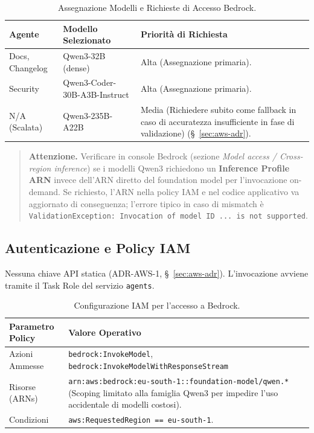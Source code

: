 \documentclass[11pt,a4paper]{article}
\begin{document}
\begin{table}[H]
\centering
\caption{Assegnazione Modelli e Richieste di Accesso Bedrock.}
\label{tab:aws-bedrock-modelli}
\vspace{2mm}
\renewcommand{\arraystretch}{1.2}
\begin{tabularx}{\textwidth}{|l|X|X|}
\hline
\textbf{Agente} & \textbf{Modello Selezionato} & \textbf{Priorità di Richiesta} \\ \hline
Docs, Changelog & Qwen3-32B (dense) & Alta (Assegnazione primaria). \\ \hline
Security & Qwen3-Coder-30B-A3B-Instruct & Alta (Assegnazione primaria). \\ \hline
N/A (Scalata) & Qwen3-235B-A22B & Media (Richiedere subito come fallback in caso di accuratezza insufficiente in fase di validazione) (\S~\ref{sec:aws-adr}). \\ \hline
\end{tabularx}
\end{table}

\begin{quote}
\textbf{Attenzione.} Verificare in console Bedrock (sezione \emph{Model access / Cross-region inference}) se i modelli Qwen3 richiedono un \textbf{Inference Profile ARN} invece dell'ARN diretto del foundation model per l'invocazione on-demand. Se richiesto, l'ARN nella policy IAM e nel codice applicativo va aggiornato di conseguenza; l'errore tipico in caso di mismatch è \texttt{ValidationException: Invocation of model ID ... is not supported}.
\end{quote}

\subsection{Autenticazione e Policy IAM}

Nessuna chiave API statica (ADR-AWS-1, \S~\ref{sec:aws-adr}). L'invocazione avviene tramite il Task Role del servizio \texttt{agents}.

\begin{table}[H]
\centering
\caption{Configurazione IAM per l'accesso a Bedrock.}
\label{tab:aws-bedrock-iam}
\vspace{2mm}
\renewcommand{\arraystretch}{1.2}
\begin{tabularx}{\textwidth}{|l|X|}
\hline
\textbf{Parametro Policy} & \textbf{Valore Operativo} \\ \hline
Azioni Ammesse & \texttt{bedrock:InvokeModel}, \texttt{bedrock:InvokeModelWithResponseStream} \\ \hline
Risorse (ARNs) & \texttt{arn:aws:bedrock:eu-south-1::foundation-model/qwen.*} (Scoping limitato alla famiglia Qwen3 per impedire l'uso accidentale di modelli costosi). \\ \hline
Condizioni & \texttt{aws:RequestedRegion == eu-south-1}. \\ \hline
\end{tabularx}
\end{table}
\end{document}
